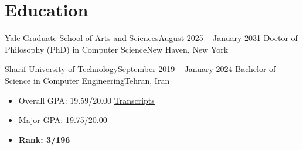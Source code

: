 \section{Education}


\resumeSubHeadingListStart
\resumeSubheading
{Yale Graduate School of Arts and Sciences}{August 2025 -- January 2031}
{Doctor of Philosophy (PhD) in Computer Science}{New Haven, New York}
\resumeSubHeadingListEnd







\resumeSubHeadingListStart
\resumeSubheading
{Sharif University of Technology}{September 2019 -- January 2024}
{Bachelor of Science in Computer Engineering}{Tehran, Iran}
\vspace*{0.2cm}
\begin{multicols}{3}[\setlength{\columnsep}{30pt}]
    \begin{itemize}
        \item Overall GPA: 19.59/20.00 \href{https://drive.google.com/file/d/1PWhdcZLzxWIpAfeUodh5ye7yV_tzekF-/view?usp=sharing}{\color{blue}\underline{Transcripts}} %
        \item Major GPA: 19.75/20.00 %
        \item \textbf{ Rank: 3/196}
    \end{itemize}
\end{multicols}

\resumeSubHeadingListEnd
